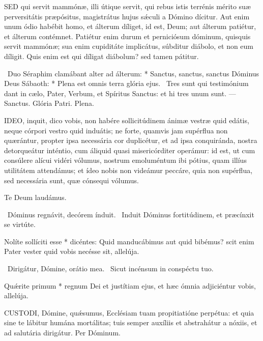 

\lettrine[lines=2]{S}{ED} qui servit mammónæ, illi útique servit, qui rebus istis terrénis mérito suæ perversitátis præpósitus, magistrátus hujus sǽculi a Dómino dícitur. Aut enim unum ódio habébit homo, et álterum díliget, id est, Deum; aut álterum patiétur, et álterum contémnet. Patiétur enim durum et perniciósum dóminum, quisquis servit mammónæ; sua enim cupiditáte implicátus, súbditur diábolo, et non eum díligit. Quis enim est qui díligat diábolum? sed tamen pátitur.

\R\ Duo Séraphim clamábant alter ad álterum: * Sanctus, sanctus, sanctus Dóminus Deus Sábaoth: * Plena est omnis terra glória ejus. \V\ Tres sunt qui testimónium dant in cælo, Pater, Verbum, et Spíritus Sanctus: et hi tres unum sunt. — Sanctus. Glória Patri. Plena.


\lettrine[lines=2]{I}{DEO}, inquit, dico vobis, non habére sollicitúdinem ánimæ vestræ quid edátis, neque córpori vestro quid induátis; ne forte, quamvis jam supérflua non quærántur, propter ipsa necessária cor duplicétur, et ad ipsa conquiránda, nostra detorqueátur inténtio, cum áliquid quasi misericórditer operámur: id est, ut cum consúlere alícui vidéri vólumus, nostrum emoluméntum ibi pótius, quam illíus utilitátem attendámus; et ídeo nobis non videámur peccáre, quia non supérflua, sed necessária sunt, quæ cónsequi vólumus.

Te Deum laudámus.


\V\ Dóminus regnávit, decórem índuit. \R\ Induit Dóminus fortitúdinem, et præcínxit se virtúte.

 Nolíte sollíciti esse * dicéntes: Quid manducábimus aut quid bibémus? scit enim Pater vester quid vobis necésse sit, allelúja.


\V\ Dirigátur, Dómine, orátio mea. \R\ Sicut incénsum in conspéctu tuo.

 Quǽrite primum * regnum Dei et justítiam ejus, et hæc ómnia adjiciéntur vobis, allelúja.


\lettrine[lines=2]{C}{USTODI}, Dómine, quǽsumus, Ecclésiam tuam propitiatióne perpétua: et quia sine te lábitur humána mortálitas; tuis semper auxíliis et abstrahátur a nóxiis, et ad salutária dirigátur. Per Dóminum.

